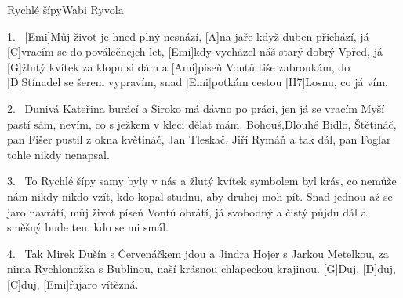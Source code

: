 %
%
%
%
%

\begin{song}{Rychlé šípy}{Wabi Ryvola}

\begin{xverse}{1.~}
[\large Emi]Můj život je hned plný nesnází,
[\large A]na jaře když duben přichází,
já [\large C]vracím se do poválečnejch let,
[\large Emi]kdy vycházel náš starý dobrý Vpřed,
já [\large G]{žlu}tý kvítek za klopu si dám
a [\large Ami]píseň Vontů tiše zabroukám,
do [\large D]Stínadel se šerem vypravím,
snad [\large Emi]potkám cestou [\large H7]Losnu, co já vím.
\end{xverse}


\begin{xverse}{2.~}
Dunivá Kateřina burácí
a Široko má dávno po práci,
jen já se vracím Myší pastí sám,
nevím, co s ježkem v kleci dělat mám.
Bohouš,Dlouhé Bidlo, Štětináč,
pan Fišer pustil z okna květináč,
Jan Tleskač, Jiří Rymáň a tak dál,
pan Foglar tohle nikdy nenapsal.
\end{xverse}


\begin{xverse}{3.~}
To Rychlé šípy samy byly v nás
a žlutý kvítek symbolem byl krás,
co nemůže nám nikdy nikdo vzít,
kdo kopal studnu, aby druhej moh pít.
Snad jednou až se jaro navrátí,
můj život píseň Vontů obrátí,
já svobodný a čistý půjdu dál
a směšný bude ten. kdo se mi smál.
\end{xverse}


\begin{xverse}{4.~}
Tak Mirek Dušín s Červenáčkem jdou
a Jindra Hojer s Jarkou Metelkou,
za nima Rychlonožka s Bublinou,
naší krásnou chlapeckou krajinou.
[\large G]Duj, [\large D]duj, [\large C]duj, [\large Emi]fujaro vítězná.
\end{xverse}
\end{song}

